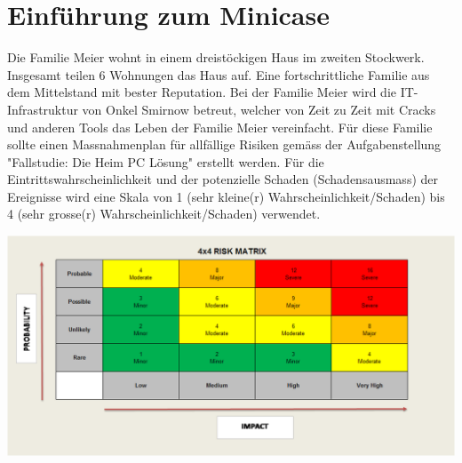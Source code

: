 \section{Einführung zum Minicase}

Die Familie Meier wohnt in einem dreistöckigen Haus im zweiten Stockwerk. Insgesamt teilen 6 Wohnungen das Haus auf. Eine fortschrittliche Familie aus dem Mittelstand mit bester Reputation.
Bei der Familie Meier wird die IT-Infrastruktur von Onkel Smirnow betreut, welcher von Zeit zu Zeit mit Cracks und anderen Tools das Leben der Familie Meier vereinfacht.
Für diese Familie sollte einen Massnahmenplan für allfällige Risiken gemäss der Aufgabenstellung "Fallstudie: Die Heim PC Lösung" erstellt werden. Für die Eintrittswahrscheinlichkeit und der potenzielle Schaden (Schadensausmass) der Ereignisse wird eine Skala von 1 (sehr kleine(r) Wahrscheinlichkeit/Schaden) bis 4 (sehr grosse(r) Wahrscheinlichkeit/Schaden) verwendet.



\includegraphics[width=\textwidth]{Risikomatrix}
